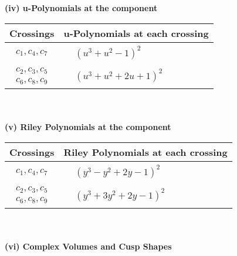 \documentclass[1p]{elsarticle_modified}
\theoremstyle{definition}
\begin{document}
\newpage\renewcommand{\arraystretch}{1}
\flushleft \textbf{(iv) u-Polynomials at the component}\newline \\
\begin{tabular}{m{50pt}|m{274pt}}
Crossings & \hspace{64pt}u-Polynomials at each crossing \\
\hline $$\begin{aligned}c_{1},c_{4},c_{7}\end{aligned}$$&$\begin{aligned}
&(u^3+u^2-1)^2
\end{aligned}$\\
\hline $$\begin{aligned}c_{2},c_{3},c_{5}\\c_{6},c_{8},c_{9}\end{aligned}$$&$\begin{aligned}
&(u^3+u^2+2 u+1)^2
\end{aligned}$\\
\hline
\end{tabular}\\~\\
\newpage\renewcommand{\arraystretch}{1}
\flushleft \textbf{(v) Riley Polynomials at the component}\newline \\
\begin{tabular}{m{50pt}|m{274pt}}
Crossings & \hspace{64pt}Riley Polynomials at each crossing \\
\hline $$\begin{aligned}c_{1},c_{4},c_{7}\end{aligned}$$&$\begin{aligned}
&(y^3- y^2+2 y-1)^2
\end{aligned}$\\
\hline $$\begin{aligned}c_{2},c_{3},c_{5}\\c_{6},c_{8},c_{9}\end{aligned}$$&$\begin{aligned}
&(y^3+3 y^2+2 y-1)^2
\end{aligned}$\\
\hline
\end{tabular}\\~\\
\newpage\flushleft \textbf{(vi) Complex Volumes and Cusp Shapes}
\end{document}
